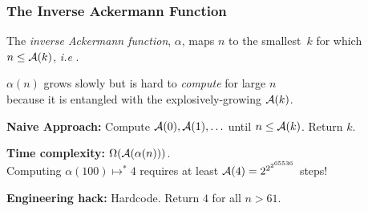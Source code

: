 			




\begin{frame}
\frametitle{The Inverse Ackermann Function}

The \emph{inverse Ackermann function}, $\alpha$, maps $n$ to the smallest~$k$ for
which~$n \le \mathcal{A}(k)$, \emph{i.e} .

\smallskip

\pause 
$\alpha(n)$ grows slowly but is hard to \emph{compute} for large $n$
\\ because it is entangled with the explosively-growing $\mathcal{A}(k)$.

\bigskip


\pause 
\textbf{Naive Approach:} Compute $\mathcal{A}(0), \mathcal{A}(1), \ldots$ until $n\le \mathcal{A}(k)$. Return $k$.

\bigskip

\pause 
\textbf{Time complexity:} $\Omega(\mathcal{A}(\alpha(n)))$.
\\ Computing $\alpha(100) \mapsto^{*} 4$ requires at least
$\mathcal{A}(4) = 2^{2^{2^{65536}}}$ steps!

\bigskip

\pause 
\textbf{Engineering hack:} Hardcode. Return $4$ for all $n > 61$.

\bigskip

\pause 
{}
\end{frame}

%
%
%
%
%
%


